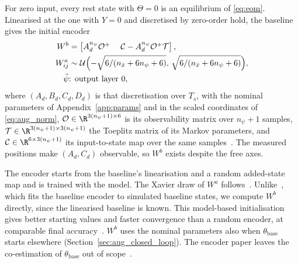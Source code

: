 For zero input, every rest state with $\Theta=0$ is an equilibrium of
\eqref{eq:eom}.
Linearised at the one with $Y=0$ and discretised by zero-order hold, the
baseline gives the initial encoder
\begin{equation}
\begin{aligned}
 W^b&=\begin{bmatrix}
  A_d^{n_\psi}\mathcal O^{+} & \;\mathcal C-A_d^{n_\psi}\mathcal O^{+}\mathcal T
 \end{bmatrix},\\
 W^a_{ij}&\sim\mathcal U\Bigl(-\sqrt{6/(n_{\bar x}+6n_\psi+6)},\,
   \sqrt{6/(n_{\bar x}+6n_\psi+6)}\Bigr),\\
 \tilde\psi&\text{: output layer }0,
\end{aligned}
\label{eq:aug_enc_init}
\end{equation}
where $(A_d,B_d,C_d,D_d)$ is that discretisation over $T_s$, with the nominal
parameters of Appendix~\ref{app:params} and in the scaled coordinates of
\eqref{eq:aug_norm}, $\mathcal O\in\R^{3(n_\psi+1)\times6}$ is its
observability matrix over $n_\psi+1$ samples, $\mathcal T\in\R^{3(n_\psi+1)\times3(n_\psi+1)}$
the Toeplitz matrix of its Markov parameters, and
$\mathcal C\in\R^{6\times3(n_\psi+1)}$ its input-to-state map over the same
samples~\cite[Eqs.~(10) to (17)]{hoekstra2026encoder}.
The measured positions make $(A_d,C_d)$ observable, so $W^b$ exists despite
the free axes.

The encoder starts from the baseline's linearisation and a random
added-state map and is trained with the model.
The Xavier draw of $W^a$ follows~\cite[Eq.~(31)]{hoekstra2026lfr}.
Unlike~\cite[Eq.~(30)]{hoekstra2026lfr}, which fits the baseline encoder to
simulated baseline states, we compute $W^b$ directly, since the linearised
baseline is known.
This model-based initialisation gives better starting values and faster
convergence than a random encoder, at comparable final
accuracy~\cite[Sec.~4.4]{hoekstra2026encoder}.
$W^b$ uses the nominal parameters also when $\theta_{\mathrm{base}}$ starts
elsewhere (Section~\ref{sec:aug_closed_loop}).
The encoder paper leaves the co-estimation of $\theta_{\mathrm{base}}$ out of
scope~\cite[footnote~1]{hoekstra2026encoder}.

